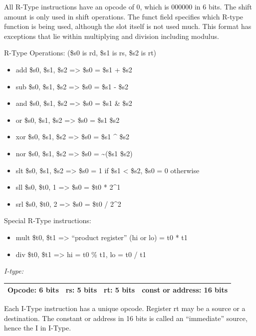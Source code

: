 \documentclass[
    parskip=half,
    fontsize=12pt,
    titlepage=firstiscover,
    toc=bibliography,
    numbers=endperiod
]{scrartcl}
\providecommand{\tightlist}{%
  \setlength{\itemsep}{0pt}\setlength{\parskip}{0pt}}
\begin{document}
All R-Type instructions have an opcode of 0, which is 000000 in 6 bits.
The shift amount is only used in shift operations. The funct field
specifies which R-type function is being used, although the slot itself
is not used much. This format has exceptions that lie within multiplying
and division including modulus.

R-Type Operations: (\$s0 is rd, \$s1 is rs, \$s2 is rt)

\begin{itemize}
    \tightlist
    \item add \$s0, \$s1, \$s2 =\textgreater{} \$s0 = \$s1 + \$s2
    \item sub \$s0, \$s1, \$s2 =\textgreater{} \$s0 = \$s1 - \$s2
    \item and \$s0, \$s1, \$s2 =\textgreater{} \$s0 = \$s1 \& \$s2
    \item or \$s0, \$s1, \$s2 =\textgreater{} \$s0 = \$s1 \textbar{} \$s2
    \item xor \$s0, \$s1, \$s2 =\textgreater{} \$s0 = \$s1 \^{} \$s2
    \item nor \$s0, \$s1, \$s2 =\textgreater{} \$s0 = \textasciitilde(\$s1 \textbar{} \$s2)
    \item slt \$s0, \$s1, \$s2 =\textgreater{} \$s0 = 1 if \$s1 \textless{} \$s2, \$s0 = 0 otherwise
    \item sll \$s0, \$t0, 1 =\textgreater{} \$s0 = \$t0 * 2\^{}1 \item srl \$s0, \$t0, 2 =\textgreater{} \$s0 = \$t0 / 2\^{}2
\end{itemize}

Special R-Type instructions:

\begin{itemize}
    \tightlist
    \item mult \$t0, \$t1 =\textgreater{} ``product register'' (hi or lo) = t0 * t1
    \item div \$t0, \$t1 =\textgreater{} hi = t0 \% t1, lo = t0 / t1
\end{itemize}

\emph{I-type:}

\begin{tabularx}{\textwidth}{@{}|c|c|c|C|@{}}
    \hline
    Opcode: 6 bits & rs: 5 bits & rt: 5 bits & const or address: 16 bits \\
    \hline
\end{tabularx}

Each I-Type instruction has a unique opcode. Register rt may be a source
or a destination. The constant or address in 16 bits is called an
``immediate'' source, hence the I in I-Type.
\end{document}
